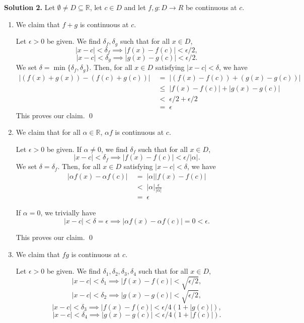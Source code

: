 \documentclass[10pt]{article}
\begin{document}
	\textbf{Solution 2.}
	Let $\emptyset \neq D \subseteq \mathbb{R}$, let $c \in D$ and let $f, g\colon D \to R$ be continuous at $c$.
	\begin{enumerate}
		\item We claim that $f + g$ is continuous at $c$.
		
		Let $\epsilon > 0$ be given.
		We find $\delta_f, \delta_g$ such that for all $x \in D$,
		\[|x - c| < \delta_f \implies |f(x) - f(c)| < \epsilon/2,\]
		\[|x - c| < \delta_g \implies |g(x) - g(c)| < \epsilon/2.\]
		We set $\delta = \min\{\delta_f, \delta_g\}$. Then, for all $x \in D$ satisfying
		$|x - c| < \delta$, we have
		\begin{align*}
			|(f(x) + g(x)) - (f(c) + g(c))| \;&=\; |(f(x) - f(c)) + (g(x) - g(c))| \\
			\;&\le\; |f(x) - f(c)| + |g(x) - g(c)| \\
			\;&<\; \epsilon/2 + \epsilon/2 \\
			\;&=\; \epsilon
		\end{align*}
		This proves our claim. \qed
		
		\item We claim that for all $\alpha \in \mathbb{R}$, $\alpha f$ is continuous at $c$.
		
		Let $\epsilon > 0$ be given.
		If $\alpha \neq 0$, we find $\delta_f$ such that for all $x \in D$,
		\[|x - c| < \delta_f \implies |f(x) - f(c)| < \epsilon/|\alpha|.\]
		We set $\delta = \delta_f$. Then, for all $x \in D$ satisfying
		$|x - c| < \delta$, we have
		\begin{align*}
			|\alpha f(x) - \alpha f(c)| \;&=\; |\alpha| |f(x) - f(c)| \\
			\;&<\; |\alpha| \frac{\epsilon}{|\alpha|} \\
			\;&=\; \epsilon
		\end{align*}
		
		If $\alpha = 0$, we trivially have
		\[|x - c| < \delta = \epsilon \implies |\alpha f(x) - \alpha f(c)| = 0 < \epsilon.\]
		
		This proves our claim. \qed
		
		\item We claim that $fg$ is continuous at $c$.
		
		Let $\epsilon > 0$ be given.
		We find $\delta_1, \delta_2, \delta_3, \delta_4$ such that for all $x \in D$,
		\[|x - c| < \delta_1 \implies |f(x) - f(c)| < \sqrt{\epsilon/2},\]
		\[|x - c| < \delta_2 \implies |g(x) - g(c)| < \sqrt{\epsilon/2},\]
		\[|x - c| < \delta_3 \implies |f(x) - f(c)| < \epsilon/4(1 + |g(c)|),\]
		\[|x - c| < \delta_4 \implies |g(x) - g(c)| < \epsilon/4(1 + |f(c)|).\]
		

\end{enumerate}
\end{document}
